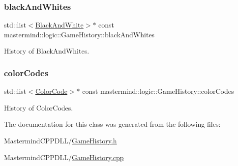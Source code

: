 \subsubsection{\texorpdfstring{black\+And\+Whites}{blackAndWhites}}
{\footnotesize\ttfamily std\+::list$<$\hyperlink{classmastermind_1_1logic_1_1_black_and_white}{Black\+And\+White}$>$$\ast$ const mastermind\+::logic\+::\+Game\+History\+::black\+And\+Whites\hspace{0.3cm}{\ttfamily [private]}}



History of Black\+And\+Whites. 

\hypertarget{classmastermind_1_1logic_1_1_game_history_a988bbccc372956773078e0e32344c1a9}{}\label{classmastermind_1_1logic_1_1_game_history_a988bbccc372956773078e0e32344c1a9} 
\subsubsection{\texorpdfstring{color\+Codes}{colorCodes}}
{\footnotesize\ttfamily std\+::list$<$\hyperlink{classmastermind_1_1logic_1_1_color_code}{Color\+Code}$>$$\ast$ const mastermind\+::logic\+::\+Game\+History\+::color\+Codes\hspace{0.3cm}{\ttfamily [private]}}



History of Color\+Codes. 



The documentation for this class was generated from the following files\+:\begin{DoxyCompactItemize}
\item 
Mastermind\+C\+P\+P\+D\+L\+L/\hyperlink{_game_history_8h}{Game\+History.\+h}\item 
Mastermind\+C\+P\+P\+D\+L\+L/\hyperlink{_game_history_8cpp}{Game\+History.\+cpp}\end{DoxyCompactItemize}
